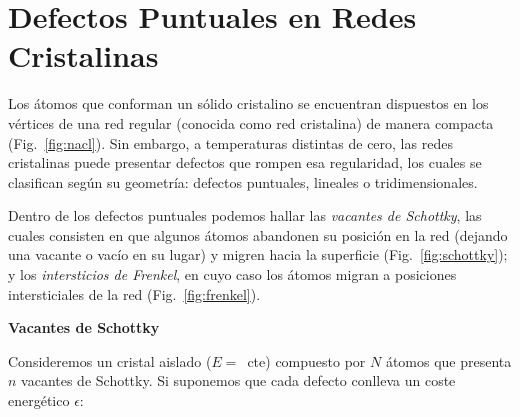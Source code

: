 \documentclass[a4paper,11pt]{article}
\begin{document}
\section{Defectos Puntuales en Redes Cristalinas}

Los átomos que conforman un sólido cristalino se encuentran
dispuestos en los vértices de una red regular (conocida como red
cristalina) de manera compacta (Fig.~\ref{fig:nacl}).
Sin embargo, a temperaturas distintas de cero, las redes cristalinas
puede presentar defectos que rompen esa regularidad, los cuales se
clasifican según su geometría: defectos puntuales, lineales o
tridimensionales.

Dentro de los defectos puntuales podemos hallar las \emph{vacantes de
Schottky}, las cuales consisten en que algunos átomos abandonen su
posición en la red (dejando una vacante o vacío en su lugar) y migren
hacia la superficie (Fig.~\ref{fig:schottky}); y los \emph{intersticios
de Frenkel}, en cuyo caso los átomos migran a posiciones intersticiales
de la red (Fig.~\ref{fig:frenkel}).


\vspace{1em}
\textbf{Vacantes de Schottky}
\vspace{0.5em}

Consideremos un cristal aislado ($E = $~cte) compuesto por $N$ átomos
que presenta $n$ vacantes de Schottky.
Si suponemos que cada defecto conlleva un coste energético $\epsilon$:
\end{document}
